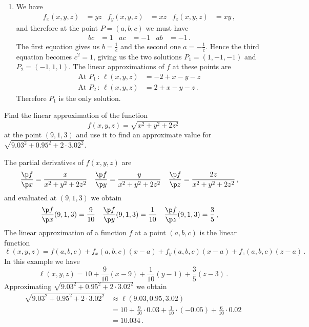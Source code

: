 \begin{solution}
\begin{enumerate}
\item
We have
\begin{align*}
f_x(x,y,z) &= yz &
f_y(x,y,z) &= xz &
f_z(x,y,z) &= xy \,,
\end{align*}
and therefore at the point $P=(a,b,c)$ we must have
\begin{align*}
bc &= 1 &
ac &= -1 &
ab &= -1\,.
\end{align*}
The first equation gives us $b = \frac 1c$ and the second one $a = -\frac 1c$. Hence the third equation becomes $c^2 = 1$, giving us the two solutions $P_1=(1,-1,-1)$ and $P_2=(-1,1,1)$. The linear approximations of $f$ at these points are
\begin{align*}
\text{At }P_1\,:\, \ell(x,y,z) &= -2 +x-y-z  \\
\text{At }P_2\,:\, \ell(x,y,z) &= 2 +x-y-z \,.
\end{align*}
Therefore $P_1$ is the only solution.
\end{enumerate}
\end{solution}


\begin{question}
Find the linear approximation of the function
\[
f(x,y,z) = \sqrt{x^2 + y^2 + 2z^2}
\]
at the point $(9, 1, 3)$ and use it to find an approximate value for 
$\sqrt{9.03^2 + 0.95^2 + 2\cdot 3.02^2}$.
\end{question}

\begin{solution}
The partial derivatives of $f(x,y,z)$ are
\begin{align*}
\frac{\p f}{\p x} &= \frac{x}{x^2 + y^2 + 2z^2} &
\frac{\p f}{\p y} &= \frac{y}{x^2 + y^2 + 2z^2} &
\frac{\p f}{\p z} &= \frac{2z}{x^2 + y^2 + 2z^2}\,,
\end{align*}
and evaluated at $(9,1,3)$ we obtain
\begin{align*}
\frac{\p f}{\p x}(9,1,3) &= \frac{9}{10} &
\frac{\p f}{\p y}(9,1,3) &= \frac{1}{10} &
\frac{\p f}{\p z}(9,1,3) &= \frac{3}{5}\,,
\end{align*}
The linear approximation of a function $f$ at a point $(a,b,c)$ is the linear function
\[
\ell(x,y,z) = f(a,b,c) + f_x(a,b,c)(x-a) + f_y(a,b,c)(x-a) + f_z(a,b,c)(z-a)\,.
\]
In this example we have
\[
\ell(x,y,z) = 10 + \frac 9{10}(x-9) + \frac 1{10}(y-1) + \frac 35 (z-3)\,.
\]
Approximating $\sqrt{9.03^2 + 0.95^2 + 2\cdot 3.02^2}$ we obtain
\begin{align*}
\sqrt{9.03^2 + 0.95^2 + 2\cdot 3.02^2} &\approx
\ell(9.03, 0.95, 3.02) \\
&= 10 + \frac{9}{10} \cdot 0.03 + \frac{1}{10} \cdot (-0.05) + \frac {6}{10} \cdot 0.02 \\
&= 10.034\,.
\end{align*}
\end{solution}

